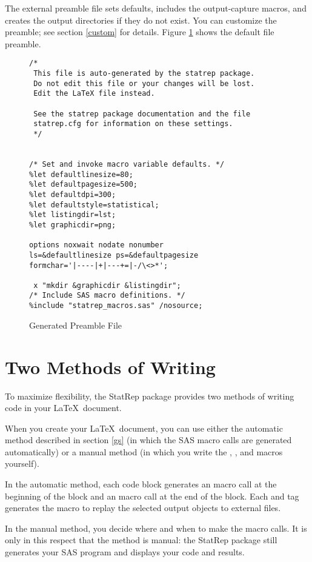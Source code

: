 \documentclass[article,oneside]{memoir}
\newcommand*{\StatRep}{\textsf{StatRep}\xspace}
\begin{document}
  The external preamble file sets defaults, includes  
  the output-capture macros, and creates the output directories if they do not exist.
  You can customize the preamble; see section \ref{custom} for details. 
  Figure \ref{fig:preamble} shows the default file preamble.
\begin{figure}[H]
\begin{snugshade}
\begin{verbatim}
/*
 This file is auto-generated by the statrep package.
 Do not edit this file or your changes will be lost.
 Edit the LaTeX file instead.
 
 See the statrep package documentation and the file
 statrep.cfg for information on these settings.
 */
 
 
/* Set and invoke macro variable defaults. */
%let defaultlinesize=80;
%let defaultpagesize=500;
%let defaultdpi=300;
%let defaultstyle=statistical;
%let listingdir=lst;
%let graphicdir=png;

options noxwait nodate nonumber
ls=&defaultlinesize ps=&defaultpagesize
formchar='|----|+|---+=|-/\<>*';

 x "mkdir &graphicdir &listingdir";
/* Include SAS macro definitions. */
%include "statrep_macros.sas" /nosource;
\end{verbatim}
\end{snugshade}
\caption{Generated Preamble File}\label{fig:preamble}
\end{figure}
  
\section{Two Methods of Writing}
  To maximize flexibility, the \StatRep package provides two methods of writing code in your
\LaTeX\ document. 

When you create your \LaTeX\ document, you can use either the automatic method described in 
section \ref{gs} (in which the SAS macro calls are generated automatically) or a manual
method (in which you write the , , and  macros yourself). 

In the automatic method, each  code block generates an  macro call at the beginning 
of the block and an  macro call at the end of the block. 
Each  and  tag generates the 
macro to replay the selected output objects to external files.

In the manual method, you decide where and when to make the macro calls.
It is only in this respect that the method is manual: the
\StatRep package still generates your SAS program and displays your code and results.
  
\end{document}
